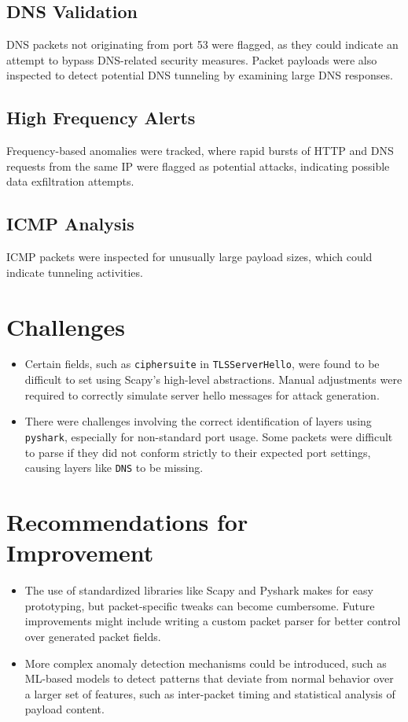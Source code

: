\documentclass{article}
\begin{document}
\subsection{DNS Validation}
DNS packets not originating from port 53 were flagged, as they could indicate an attempt to bypass DNS-related security measures. Packet payloads were also inspected to detect potential DNS tunneling by examining large DNS responses.

\subsection{High Frequency Alerts}
Frequency-based anomalies were tracked, where rapid bursts of HTTP and DNS requests from the same IP were flagged as potential attacks, indicating possible data exfiltration attempts.

\subsection{ICMP Analysis}
ICMP packets were inspected for unusually large payload sizes, which could indicate tunneling activities.

\section{Challenges}

\begin{itemize}
    \item Certain fields, such as \texttt{ciphersuite} in \texttt{TLSServerHello}, were found to be difficult to set using Scapy's high-level abstractions. Manual adjustments were required to correctly simulate server hello messages for attack generation.
    \item There were challenges involving the correct identification of layers using \texttt{pyshark}, especially for non-standard port usage. Some packets were difficult to parse if they did not conform strictly to their expected port settings, causing layers like \texttt{DNS} to be missing.
\end{itemize}

\section{Recommendations for Improvement}

\begin{itemize}
    \item The use of standardized libraries like Scapy and Pyshark makes for easy prototyping, but packet-specific tweaks can become cumbersome. Future improvements might include writing a custom packet parser for better control over generated packet fields.
    \item More complex anomaly detection mechanisms could be introduced, such as ML-based models to detect patterns that deviate from normal behavior over a larger set of features, such as inter-packet timing and statistical analysis of payload content.
\end{itemize}
\end{document}
